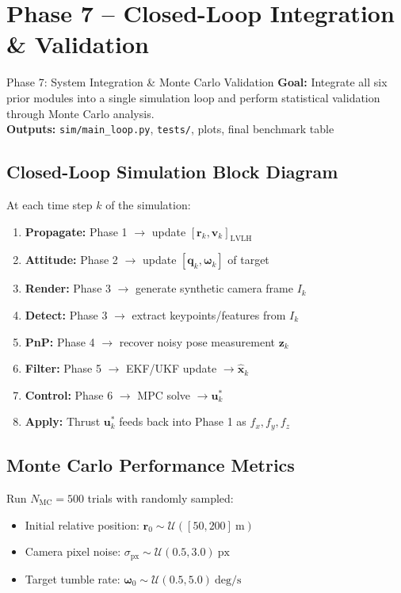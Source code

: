 \documentclass[12pt, a4paper]{article}
\newcommand{\vr}{\mathbf{r}}
\newcommand{\vv}{\mathbf{v}}
\newcommand{\vx}{\mathbf{x}}
\newcommand{\vcu}{\mathbf{u}}
\newcommand{\vq}{\mathbf{q}}
\newcommand{\vw}{\bm{\omega}}
\newcommand{\LVLH}{\mathrm{LVLH}}
\begin{document}
\section{Phase 7 -- Closed-Loop Integration \& Validation}

\begin{phasebox}{Phase 7: System Integration \& Monte Carlo Validation}
\textbf{Goal:} Integrate all six prior modules into a single simulation
loop and perform statistical validation through Monte Carlo analysis.\\[0.5em]
\textbf{Outputs:} \texttt{sim/main\_loop.py}, \texttt{tests/}, plots,
final benchmark table
\end{phasebox}

\subsection{Closed-Loop Simulation Block Diagram}

At each time step $k$ of the simulation:
\begin{enumerate}[leftmargin=2em, itemsep=3pt]
    \item \textbf{Propagate:} Phase 1 $\rightarrow$ update $[\vr_k, \vv_k]_{\LVLH}$
    \item \textbf{Attitude:} Phase 2 $\rightarrow$ update $[\vq_k, \vw_k]$ of target
    \item \textbf{Render:} Phase 3 $\rightarrow$ generate synthetic camera frame $I_k$
    \item \textbf{Detect:} Phase 3 $\rightarrow$ extract keypoints/features from $I_k$
    \item \textbf{PnP:} Phase 4 $\rightarrow$ recover noisy pose measurement $\mathbf{z}_k$
    \item \textbf{Filter:} Phase 5 $\rightarrow$ EKF/UKF update $\to \hat{\vx}_k$
    \item \textbf{Control:} Phase 6 $\rightarrow$ MPC solve $\to \vcu_k^*$
    \item \textbf{Apply:} Thrust $\vcu_k^*$ feeds back into Phase 1 as $f_x, f_y, f_z$
\end{enumerate}

\subsection{Monte Carlo Performance Metrics}

Run $N_{\mathrm{MC}} = 500$ trials with randomly sampled:
\begin{itemize}[leftmargin=2em]
    \item Initial relative position: $\vr_0 \sim \mathcal{U}([50, 200]\ \mathrm{m})$
    \item Camera pixel noise: $\sigma_{\mathrm{px}} \sim \mathcal{U}(0.5, 3.0)\ \mathrm{px}$
    \item Target tumble rate: $\vw_0 \sim \mathcal{U}(0.5, 5.0)\ \mathrm{deg/s}$
\end{itemize}
\end{document}
